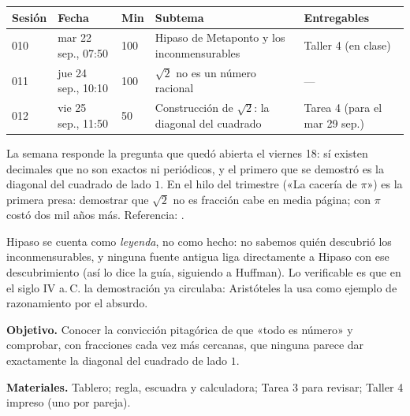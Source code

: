 \documentclass[11pt]{article}
\begin{document}
\encabezado*

\begin{center}
{\renewcommand{\arraystretch}{1.3}
\begin{tabularx}{\linewidth}{@{}l l l X l@{}}
  \toprule
  \textbf{Sesión} & \textbf{Fecha} & \textbf{Min} & \textbf{Subtema} & \textbf{Entregables}\\
  \midrule
  010 & mar 22 sep., 07:50 & 100 & Hipaso de Metaponto y los inconmensurables & Taller 4 (en clase)\\
  011 & jue 24 sep., 10:10 & 100 & $\sqrt{2}$ no es un número racional & —\\
  012 & vie 25 sep., 11:50 & 50  & Construcción de $\sqrt{2}$: la diagonal del cuadrado & Tarea 4 (para el mar 29 sep.)\\
  \bottomrule
\end{tabularx}}
\end{center}

La semana responde la pregunta que quedó abierta el viernes 18: sí existen decimales que no
son exactos ni periódicos, y el primero que se demostró es la diagonal del cuadrado de lado
$1$. En el hilo del trimestre («La cacería de $\pi$») es la primera presa: demostrar que
$\sqrt{2}$ no es fracción cabe en media página; con $\pi$ costó dos mil años más.
Referencia: .

\begin{nota}
Hipaso se cuenta como \emph{leyenda}, no como hecho: no sabemos quién descubrió los
inconmensurables, y ninguna fuente antigua liga directamente a Hipaso con ese descubrimiento
(así lo dice la guía, siguiendo a Huffman). Lo verificable es que en el siglo IV a.\,C. la
demostración ya circulaba: Aristóteles la usa como ejemplo de razonamiento por el absurdo.
\end{nota}


\textbf{Objetivo.} Conocer la convicción pitagórica de que «todo es número» y comprobar, con
fracciones cada vez más cercanas, que ninguna parece dar exactamente la diagonal del cuadrado
de lado $1$.

\textbf{Materiales.} Tablero; regla, escuadra y calculadora; Tarea 3 para revisar; Taller 4
impreso (uno por pareja).
\end{document}
